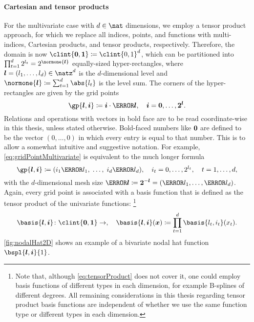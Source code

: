 \paragraph{Cartesian and tensor products}

For the multivariate case with $d \in \nat$ dimensions,
we employ a tensor product approach,
for which we replace all indices, points, and functions with
multi-indices, Cartesian products, and tensor products, respectively.
Therefore, the domain is now $\clint{\*0, \*1} \ceq \clint{0, 1}^d$,
which can be partitioned into
$\prod_{t=1}^d 2^{l_t} = 2^{\normone{\vec{l}}}$ equally-sized hyper-rectangles,
where $\*l = (l_1, \dotsc, l_d) \in \natz^d$ is the $d$-dimensional level
and $\normone{\vec{l}} \ceq \sum_{t=1}^d \abs{l_t}$ is the level sum.
The corners of the hyper-rectangles are given by the grid points
\begin{equation}
  \label{eq:gridPointMultivariate}
  \gp{\*l,\*i} \ceq \*i \cdot \ms{\*l},\quad
  \*i = \*0, \dotsc, \*2^{\*l}.
\end{equation}
Relations and operations with vectors in bold face
are to be read coordinate-wise in this thesis, unless stated otherwise.
Bold-faced numbers like ${\boldsymbol{0}}$ are defined to be the vector $(0, \dotsc, 0)$
in which every entry is equal to that number.
This is to allow a somewhat intuitive and suggestive notation.
For example, \eqref{eq:gridPointMultivariate} is equivalent to
the much longer formula
\begin{equation}
  \gp{\*l,\*i}
  \ceq (i_1 \ms{l_1},\; \dotsc,\; i_d \ms{l_d}),\quad
  i_t = 0, \dotsc, 2^{l_t},\quad
  t = 1, \dotsc, d,
\end{equation}
with the $d$-dimensional mesh size
$\ms{\*l} \ceq \*2^{-\*l} = (\ms{l_1}, \dotsc, \ms{l_d})$.
Again, every grid point is associated with a basis function that is defined
as the tensor product of the univariate functions:%
\footnote{%
  Note that,
  although \cref{eq:tensorProduct} does not cover it,
  one could employ basis functions of different types in
  each dimension, for example B-splines of different degrees.
  All remaining considerations in this thesis
  regarding tensor product basis functions are independent
  of whether we use the same function type or
  different types in each dimension.%
}
\begin{equation}
  \label{eq:tensorProduct}
  \basis{\*l,\*i}\colon \clint{\*0, \*1} \to \real,\quad
  \basis{\*l,\*i}(\*x)
  \ceq \prod_{t=1}^d \basis{l_t,i_t}(x_t).
\end{equation}
\cref{fig:nodalHat2D} shows an example of a bivariate nodal hat function
$\bspl{\*l,\*i}{1}$.

